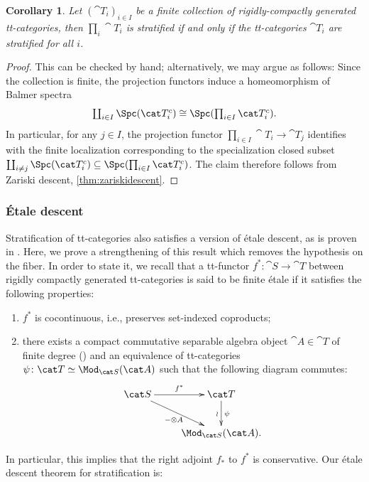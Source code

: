 \documentclass{amsart}%
\numberwithin{equation}{section}%
\newtheorem{Cor}[equation]{Corollary}
\theoremstyle{remark}
\newcounter{enum-resume-hack}
\begin{document}
\begin{Cor}\label{cor:stratfiniteproduct}
Let $(\cat T_i)_{i \in I}$ be a finite collection of rigidly-compactly generated tt-categories, then $\prod_i\cat T_i$ is stratified if and only if the tt-categories $\cat T_i$ are stratified for all $i$.
\end{Cor}
\begin{proof}
This can be checked by hand; alternatively, we may argue as follows: Since the collection is finite, the projection functors induce a homeomorphism of Balmer spectra
\[
\textstyle{\coprod_{i\in I} \Spc(\cat T_i^c) \cong \Spc(\prod_{i \in I}\cat T_i^c).}
\]
In particular, for any $j\in I$, the projection functor $\prod_{i \in I}\cat T_i \to \cat T_j$ identifies with the finite localization corresponding to the specialization closed subset $\coprod_{i \neq j} \Spc(\cat T_i^c) \subseteq \Spc(\prod_{i \in I}\cat T_i^c)$. The claim therefore follows from Zariski descent, \cref{thm:zariskidescent}.
\end{proof}


\subsubsection{\'Etale descent}

Stratification of tt-categories also satisfies a version of \'etale descent, as is proven in \cite[Thm.~6.4]{bhs1}. Here, we prove a strengthening of this result which removes the hypothesis on the fiber. In order to state it, we recall that a tt-functor $f^*\colon \cat S \to \cat T$ between rigidly compactly generated tt-categories is said to be finite \'etale if it satisfies the following properties:
    \begin{enumerate}
        \item $f^*$ is cocontinuous, i.e., preserves set-indexed coproducts;
        \item there exists a compact commutative separable algebra object $\cat A \in \cat T$ of finite degree (\cite{Balmer14}) and an equivalence of tt-categories $\psi\colon\cat T \simeq \Mod_{\cat S}(\cat A)$ such that the following diagram commutes:
            \[
            \xymatrix{\cat S \ar[r]^-{f^*} \ar[rd]_{-\otimes A} & \cat T \ar[d]_{\wr}^{\psi} \\
            & \Mod_{\cat S}(\cat A).}
            \]
    \end{enumerate}
In particular, this implies that the right adjoint $f_*$ to $f^*$ is conservative. Our \'etale descent theorem for stratification is:
\end{document}

